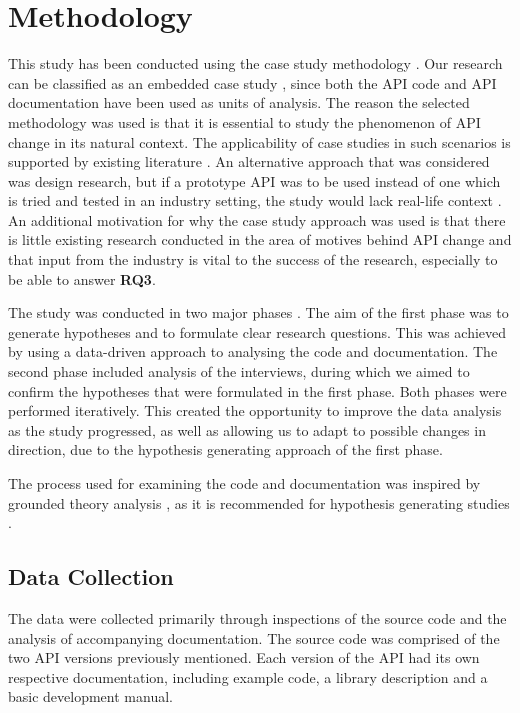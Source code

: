 \documentclass{sig-alternate}
\begin{document}
\section{Methodology} \label{methodology}
This study has been conducted using the case study methodology \cite{runeson2009guidelines}. Our research can be classified as an embedded case study \cite{yin2013case}, since both the API code and API documentation have been used as units of analysis. The reason the selected methodology was used is that it is essential to study the phenomenon of API change in its natural context. The applicability of case studies in such scenarios is supported by existing literature \cite{benbasat1987case, runeson2009guidelines, yin2013case, robson2002real}. An alternative approach that was considered was design research, but if a prototype API was to be used instead of one which is tried and tested in an industry setting, the study would lack real-life context \cite{runeson2009guidelines}. An additional motivation for why the case study approach was used is that there is little existing research conducted in the area of motives behind API change and that input from the industry is vital to the success of the research, especially to be able to answer \textbf{RQ3}. 

The study was conducted in two major phases \cite{andersson2007spiral}. The aim of the first phase was to generate hypotheses and to formulate clear research questions. This was achieved by using a data-driven approach to analysing the code and documentation. The second phase included analysis of the interviews, during which we aimed to confirm the hypotheses that were formulated in the first phase. Both phases were performed iteratively. This created the opportunity to improve the data analysis as the study progressed, as well as allowing us to adapt to possible changes in direction, due to the hypothesis generating approach of the first phase. 

The process used for examining the code and documentation was inspired by grounded theory analysis \cite{seaman1999qualitative}, as it is recommended for hypothesis generating studies \cite{runeson2009guidelines, seaman1999qualitative}. 






\subsection{Data Collection} \label{data_collection}  
The data were collected primarily through inspections of the source code and the analysis of accompanying documentation. The source code was comprised of the two API versions previously mentioned. Each version of the API had its own respective documentation, including example code, a library description and a basic development manual. 
\end{document}
